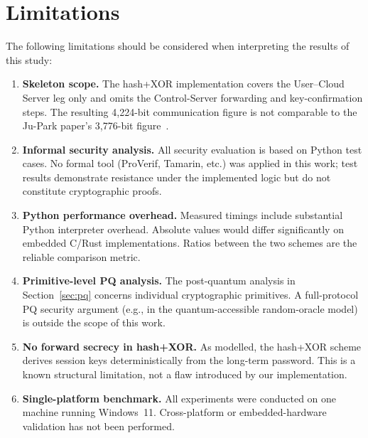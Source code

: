 \documentclass[journal]{IEEEtran}
\begin{document}
\section{Limitations}
\label{sec:limitations}

The following limitations should be considered when interpreting the results
of this study:

\begin{enumerate}
  \item \textbf{Skeleton scope.} The hash+XOR implementation covers the
    User--Cloud Server leg only and omits the Control-Server forwarding and
    key-confirmation steps. The resulting 4,224-bit communication figure is
    not comparable to the Ju-Park paper's 3,776-bit figure~\cite{JuPark2023}.

  \item \textbf{Informal security analysis.} All security evaluation is based
    on Python test cases. No formal tool (ProVerif, Tamarin, etc.) was applied
    in this work; test results demonstrate resistance under the implemented
    logic but do not constitute cryptographic proofs.

  \item \textbf{Python performance overhead.} Measured timings include
    substantial Python interpreter overhead. Absolute values would differ
    significantly on embedded C/Rust implementations. Ratios between the two
    schemes are the reliable comparison metric.

  \item \textbf{Primitive-level PQ analysis.} The post-quantum analysis in
    Section~\ref{sec:pq} concerns individual cryptographic primitives. A
    full-protocol PQ security argument (e.g., in the quantum-accessible
    random-oracle model) is outside the scope of this work.

  \item \textbf{No forward secrecy in hash+XOR.} As modelled, the hash+XOR
    scheme derives session keys deterministically from the long-term password.
    This is a known structural limitation, not a flaw introduced by our
    implementation.

  \item \textbf{Single-platform benchmark.} All experiments were conducted on
    one machine running Windows~11. Cross-platform or embedded-hardware
    validation has not been performed.
\end{enumerate}
\end{document}
